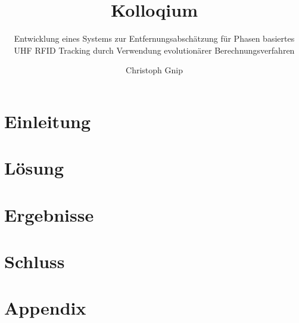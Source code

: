 \documentclass[10pt, draft]{beamer}
\title{Kolloqium}
\subtitle{Entwicklung eines Systems zur
			  Entfernungsabschätzung für
			  Phasen basiertes UHF 
			  RFID Tracking durch 
			  Verwendung evolutionärer
			  Berechnungsverfahren}
\author{Christoph Gnip}
\begin{document}
\maketitle
\frame{\tableofcontents}
\section{Einleitung}

\section{Lösung}

\section{Ergebnisse}

\section{Schluss}

\section*{Appendix}



\end{document}
